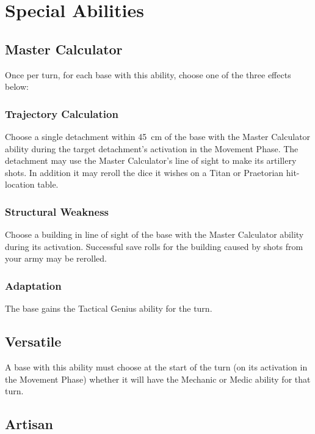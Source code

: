 \section{Special Abilities}

\subsection{Master Calculator}

Once per turn, for each base with this ability, choose one of the three effects below:

\subsubsection{Trajectory Calculation}

Choose a single detachment within 45~cm of the base with the Master Calculator ability during the target detachment's activation in the Movement Phase. The detachment may use the Master Calculator's line of sight to make its artillery shots. In addition it may reroll the dice it wishes on a Titan or Praetorian hit-location table.

\subsubsection{Structural Weakness}

Choose a building in line of sight of the base with the Master Calculator ability during its activation. Successful save rolls for the building caused by shots from your army may be rerolled.

\subsubsection{Adaptation}

The base gains the Tactical Genius ability for the turn.

\subsection{Versatile}

A base with this ability must choose at the start of the turn (on its activation in the Movement Phase) whether it will have the Mechanic or Medic ability for that turn.

\subsection{Artisan}

